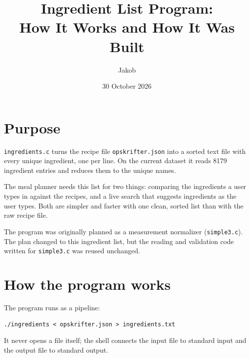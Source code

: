 \documentclass[11pt,a4paper]{article}
\title{Ingredient List Program:\\How It Works and How It Was Built}
\author{Jakob}
\date{30 October 2026}
\newcommand{\code}[1]{\texttt{#1}}
\begin{document}
\maketitle

\section{Purpose}

\code{ingredients.c} turns the recipe file \code{opskrifter.json} into a sorted
text file with every unique ingredient, one per line. On the current dataset it
reads 8179 ingredient entries and reduces them to the unique names.

The meal planner needs this list for two things: comparing the ingredients a
user types in against the recipes, and a live search that suggests ingredients
as the user types. Both are simpler and faster with one clean, sorted list than
with the raw recipe file.

The program was originally planned as a measurement normalizer
(\code{simple3.c}). The plan changed to this ingredient list, but the reading
and validation code written for \code{simple3.c} was reused unchanged.

\section{How the program works}

The program runs as a pipeline:

\begin{center}
\code{./ingredients < opskrifter.json > ingredients.txt}
\end{center}

It never opens a file itself; the shell connects the input file to standard
input and the output file to standard output.
\end{document}
